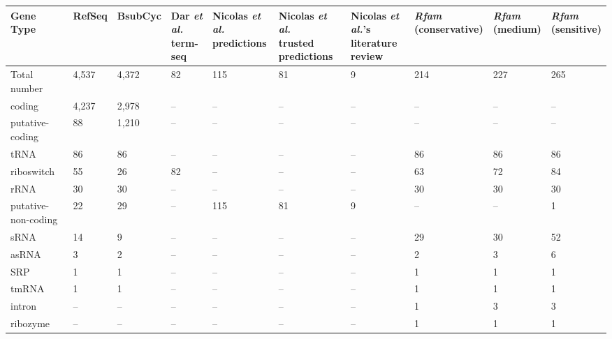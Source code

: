 \begin{tabular}{llllllllll}
\toprule
Gene Type & RefSeq & BsubCyc & \specialcell{Dar \emph{et al.}\\ term-seq} & \specialcell{Nicolas \emph{et al.}\\ predictions} & \specialcell{Nicolas \emph{et al.}\\ trusted predictions} & \specialcell{Nicolas \emph{et al.}'s\\ literature review} & \specialcell{\emph{Rfam}\\ (conservative)} & \specialcell{\emph{Rfam}\\ (medium)} & \specialcell{\emph{Rfam}\\ (sensitive)}\\
\midrule
Total number & 4,537 & 4,372 & 82 & 115 & 81 & 9 & 214 & 227 & 265\\
coding & 4,237 & 2,978 & -- & -- & -- & -- & -- & -- & --\\
putative-coding & 88 & 1,210 & -- & -- & -- & -- & -- & -- & --\\
tRNA & 86 & 86 & -- & -- & -- & -- & 86 & 86 & 86\\
riboswitch & 55 & 26 & 82 & -- & -- & -- & 63 & 72 & 84\\
rRNA & 30 & 30 & -- & -- & -- & -- & 30 & 30 & 30\\
putative-non-coding & 22 & 29 & -- & 115 & 81 & 9 & -- & -- & 1\\
sRNA & 14 & 9 & -- & -- & -- & -- & 29 & 30 & 52\\
asRNA & 3 & 2 & -- & -- & -- & -- & 2 & 3 & 6\\
SRP & 1 & 1 & -- & -- & -- & -- & 1 & 1 & 1\\
tmRNA & 1 & 1 & -- & -- & -- & -- & 1 & 1 & 1\\
intron & -- & -- & -- & -- & -- & -- & 1 & 3 & 3\\
ribozyme & -- & -- & -- & -- & -- & -- & 1 & 1 & 1\\
\bottomrule
\end{tabular}
